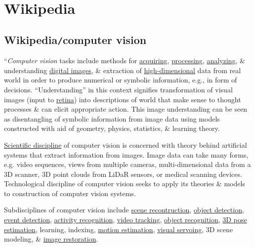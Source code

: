 \documentclass{article}
\begin{document}

\section{Wikipedia}

\subsection{Wikipedia{\tt/}computer vision}
``{\it Computer vision} tasks include methods for \href{https://en.wikipedia.org/wiki/Image_sensor}{acquiring}, \href{https://en.wikipedia.org/wiki/Image_processing}{processing}, \href{https://en.wikipedia.org/wiki/Image_analysis}{analyzing}, \& understanding \href{https://en.wikipedia.org/wiki/Digital_image}{digital images}, \& extraction of \href{https://en.wikipedia.org/wiki/High-dimensional}{high-dimensional} data from real world in order to produce numerical or symbolic information, e.g., in form of decisions. ``Understanding'' in this context signifies transformation of visual images (input to \href{https://en.wikipedia.org/wiki/Retina}{retina}) into descriptions of world that make sense to thought processes \& can elicit appropriate action. This image understanding can be seen as disentangling of symbolic information from image data using models constructed with aid of geometry, physics, statistics, \& learning theory.

\href{https://en.wikipedia.org/wiki/Scientific_discipline}{Scientific discipline} of computer vision is concerned with theory behind artificial systems that extract information from images. Image data can take many forms, e.g. video sequences, views from multiple cameras, multi-dimensional data from a 3D scanner, 3D point clouds from LiDaR sensors, or medical scanning devices. Technological discipline of computer vision seeks to apply its theories \& models to construction of computer vision systems.

Subdisciplines of computer vision include \href{https://en.wikipedia.org/wiki/3D_reconstruction}{scene recontruction}, \href{https://en.wikipedia.org/wiki/Object_detection}{object detection}, \href{https://en.wikipedia.org/wiki/Event_detection}{event detection}, \href{https://en.wikipedia.org/wiki/Activity_recognition}{activity recognition}, \href{https://en.wikipedia.org/wiki/Video_tracking}{video tracking}, \href{https://en.wikipedia.org/wiki/Object_recognition}{object recognition}, \href{https://en.wikipedia.org/wiki/3D_pose_estimation}{3D pose estimation}, learning, indexing, \href{https://en.wikipedia.org/wiki/Motion_estimation}{motion estimation}, \href{https://en.wikipedia.org/wiki/Visual_servoing}{visual servoing}, 3D scene modeling, \& \href{https://en.wikipedia.org/wiki/Digital_photograph_restoration}{image restoration}.
\end{document}
